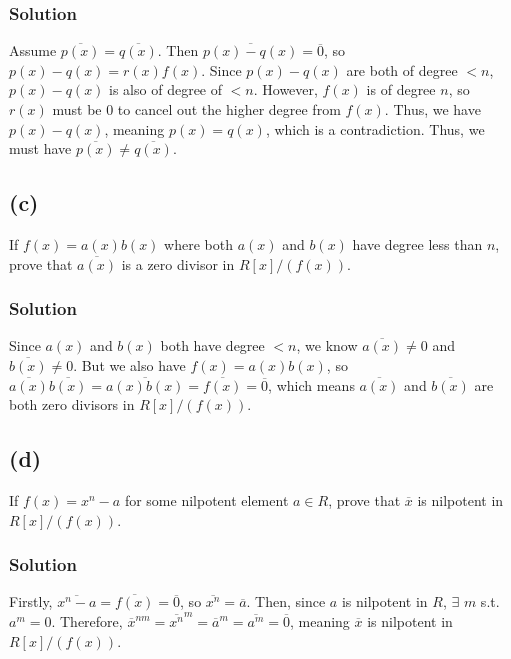 \documentclass[fleqn]{article}
\begin{document}
            \subsubsection{Solution}
            Assume $\overline{p(x)} = \overline{q(x)}$.  Then $\overline{p(x) - q(x)} = \overline{0}$, so $p(x) - q(x) = r(x)f(x)$.  Since $p(x) - q(x)$ are both of degree $< n$, $p(x) - q(x)$ is also of degree of $< n$.  However, $f(x)$ is of degree $n$, so $r(x)$ must be 0 to cancel out the higher degree from $f(x)$.  Thus, we have $p(x) - q(x)$, meaning $p(x) = q(x)$, which is a contradiction.  Thus, we must have $\overline{p(x)} \neq \overline{q(x)}$.
        
        \subsection{(c)}
        If $f(x) = a(x) b(x)$ where both $a(x)$ and $b(x)$ have degree less than $n$, prove that $\overline{a(x)}$ is a zero divisor in $R[x]/(f(x))$.
            
            \subsubsection{Solution}
            Since $a(x)$ and $b(x)$ both have degree $< n$, we know $\overline{a(x)} \neq 0$ and $\overline{b(x)} \neq 0$.  But we also have $f(x) = a(x)b(x)$, so $\overline{a(x)}\overline{b(x)} = \overline{a(x)b(x)} = \overline{f(x)} = \overline{0}$, which means $\overline{a(x)}$ and $\overline{b(x)}$ are both zero divisors in $R[x]/(f(x))$.
        
        \subsection{(d)}
        If $f(x) = x^n - a$ for some nilpotent element $a \in R$, prove that $\overline{x}$ is nilpotent in $R[x]/(f(x))$.
            
            \subsubsection{Solution}
            Firstly, $\overline{x^n - a} = \overline{f(x)} = \overline{0}$, so $\overline{x^n} = \overline{a}$.  Then, since $a$ is nilpotent in $R$, $\exists$ $m$ s.t.\ $a^m = 0$.  Therefore, $\overline{x}^{nm} = \overline{x^n}^m = \overline{a}^m = \overline{a^m} = \overline{0}$, meaning $\overline{x}$ is nilpotent in $R[x]/(f(x))$.
        
\end{document}
